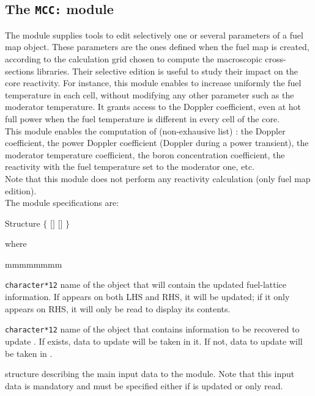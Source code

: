 \subsection{The {\tt MCC:} module}\label{sect:MCCData}

The  module supplies tools to edit selectively one or several parameters of a fuel map object. These parameters are the ones defined when the fuel map is created, according to the calculation grid chosen to compute the macroscopic cross-sections libraries. Their selective edition is useful to study their impact on the core reactivity. For instance, this module enables to increase uniformly the fuel temperature in each cell, without modifying any other parameter such as the moderator temperature. It grants access to the Doppler coefficient, even at hot full power when the fuel temperature is different in every cell of the core.\\

This module enables the computation of (non-exhausive list) : the Doppler coefficient, the power Doppler coefficient (Doppler during a power transient), the moderator temperature coefficient, the boron concentration coefficient, the reactivity with the fuel temperature set to the moderator one, etc.\\

Note that this module does not perform any reactivity calculation (only fuel map edition).\\

The  module specifications are:

\begin{DataStructure}{Structure }
$\{$ $[$$]$ \moc{:=}
  $[$$]$ \moc{::}  
$\}$\\
\end{DataStructure}

\noindent where
\begin{ListeDeDescription}{mmmmmmmm}

\item[\dusa{FLMAP1}] \texttt{character*12} name of the  object that will contain the updated fuel-lattice information. If  appears on both LHS and RHS, it will be updated; if it only appears on RHS, it will only be read to display its contents.

\item[\dusa{FLMAP2}] \texttt{character*12} name of the  object that contains information to be recovered to update . If  exists, data to update  will be taken in it. If not, data to update  will be taken in .

\item[\dstr{descmcc1}] structure describing the main input data to the  module. Note that this input data is mandatory and must be specified either if  is updated or only read.

\end{ListeDeDescription}

